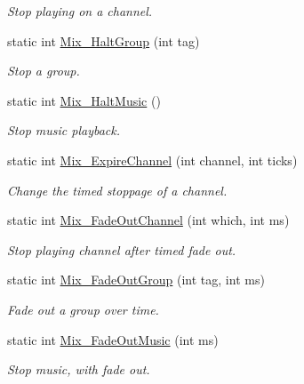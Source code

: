 \begin{DoxyCompactItemize}
\begin{DoxyCompactList}\small\item\em Stop playing on a channel. \item\end{DoxyCompactList}\item 
static int \hyperlink{namespace_tao_1_1_sdl_a4258ef0d85b4386a9d14beafbdf27097}{Mix\_\-HaltGroup} (int tag)
\begin{DoxyCompactList}\small\item\em Stop a group. \item\end{DoxyCompactList}\item 
static int \hyperlink{namespace_tao_1_1_sdl_ad6b1e382668e4df2c1aee4f1cabb7b38}{Mix\_\-HaltMusic} ()
\begin{DoxyCompactList}\small\item\em Stop music playback. \item\end{DoxyCompactList}\item 
static int \hyperlink{namespace_tao_1_1_sdl_ae3cabd61d01191a69148822346ec8b6b}{Mix\_\-ExpireChannel} (int channel, int ticks)
\begin{DoxyCompactList}\small\item\em Change the timed stoppage of a channel. \item\end{DoxyCompactList}\item 
static int \hyperlink{namespace_tao_1_1_sdl_afb3c1e03f7f07d16f5827c80ba01f4fa}{Mix\_\-FadeOutChannel} (int which, int ms)
\begin{DoxyCompactList}\small\item\em Stop playing channel after timed fade out. \item\end{DoxyCompactList}\item 
static int \hyperlink{namespace_tao_1_1_sdl_a11fb89c0edcfbb1131a77d1e12030123}{Mix\_\-FadeOutGroup} (int tag, int ms)
\begin{DoxyCompactList}\small\item\em Fade out a group over time. \item\end{DoxyCompactList}\item 
static int \hyperlink{namespace_tao_1_1_sdl_a6be5427391343f79e29eaab89c44137d}{Mix\_\-FadeOutMusic} (int ms)
\begin{DoxyCompactList}\small\item\em Stop music, with fade out. \item\end{DoxyCompactList}\item 

\end{DoxyCompactItemize}
